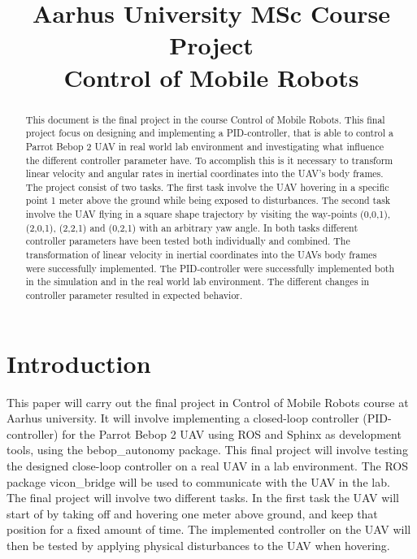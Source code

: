 \documentclass[conference]{IEEEtran}
\begin{document}
\title{Aarhus University MSc Course Project  \\ Control of Mobile Robots}

\author{
}

\maketitle

\begin{abstract}

This document is the final project in the course Control of Mobile Robots. This final project focus on designing and implementing a PID-controller, that is able to control a Parrot Bebop 2 UAV in real world lab environment and investigating what influence the different controller parameter have. To accomplish this is it necessary to transform linear velocity and angular rates in inertial coordinates into the UAV's body frames. The project consist of two tasks. The first task involve the UAV hovering in a specific point 1 meter above the ground while being exposed to disturbances. The second task involve the UAV flying in a square shape trajectory by visiting the way-points (0,0,1), (2,0,1), (2,2,1) and (0,2,1) with an arbitrary yaw angle. 
In both tasks different controller parameters have been tested both individually and combined. The transformation of linear velocity in inertial coordinates into the UAVs body frames were successfully implemented. The PID-controller were successfully implemented both in the simulation and in the real world lab environment. The different changes in controller parameter resulted in expected behavior. 

\end{abstract}

\section{Introduction}

This paper will carry out the final project in Control of Mobile Robots course at Aarhus university. It will involve implementing a closed-loop controller (PID-controller) for the Parrot Bebop 2 UAV using ROS and Sphinx as development tools, using the bebop\_autonomy package. This final project will involve testing the designed close-loop controller on a real UAV in a lab environment. The ROS package vicon\_bridge will be used to communicate with the UAV in the lab. \\
The final project will involve two different tasks. In the first task the UAV will start of by taking off and hovering one meter above ground, and keep that position for a fixed amount of time. The implemented controller on the UAV will then be tested by applying physical disturbances to the UAV when hovering. 
\end{document}
